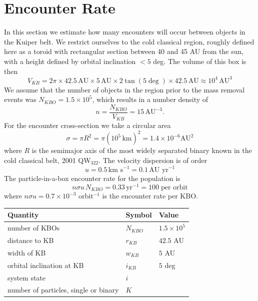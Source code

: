 \documentclass[a4paper,12pt]{article}
\begin{document}
\section{Encounter Rate}
\label{sec:encounterRate}

In this section we estimate how many encounters will occur between objects in the Kuiper belt. We restrict ourselves to the cold classical region, roughly defined here as a toroid with rectangular section between 40 and 45 AU from the sun, with a height defined by orbital inclination $<5$ deg. The volume of this box is then
\begin{equation}
V_{KB} = 2\pi\times 42.5\,\text{AU}\times 5\,\text{AU} \times 2\tan{(5\deg)}\times 42.5\,\text{AU}\approx 10^4 \,\text{AU}^3
\end{equation}
We assume that the number of objects in the region prior to the mass removal events was $N_{KBO}=1.5\times 10^5$, which results in a number density of 
\begin{equation}
n =\frac{N_{KBO}}{V_{KB}}=15 \,\text{AU}^{-3}.
\end{equation}
For the encounter cross-section we take a circular area 
\begin{equation}
\sigma =\pi R^2 = \pi  (10^5 \,\text{km})^2=1.4\times 10^{-6} \text{AU}^2
\end{equation}
where $R$ is the semimajor axis of the most widely separated binary known in the cold classical belt, 2001 QW$_{322}$. The velocity dispersion is of order 
\begin{equation}
u=0.5 \,\text{km s}^{-1}=0.1 \,\text{AU yr}^{-1}
\end{equation}
The particle-in-a-box encounter rate for the population is
\begin{equation}
n \sigma u \,N_{KBO} = 0.33 \,\text{yr}^{-1} = 100 \;\text{per orbit}
\end{equation}
where $n\sigma u=0.7\times 10^{-3}$ orbit$^{-1}$ is the encounter rate per KBO.

\begin{table}
\centering
\begin{tabular}{lll}
Quantity & Symbol & Value \\ \hline
number of KBOs & $N_{KBO}$ & $1.5\times10^5$ \\
distance to KB & $r_{KB}$ & $42.5$ AU \\
width of KB & $w_{KB}$ & $5$ AU \\
orbital inclination at KB & $i_{KB}$ & $5$ deg \\
system state & $i$ & \\
number of particles, single or binary & $K$ & \\
\end{tabular}
\end{table}
\end{document}
